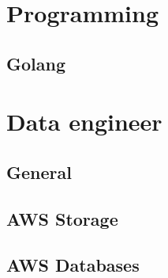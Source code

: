 \documentclass{book}
\begin{document}
\tableofcontents

\chapter{Programming}
\section{Golang}


\chapter{Data engineer}

\section{General}

\newpage
\section{AWS Storage}

\newpage
\section{AWS Databases}

\newpage
\end{document}
